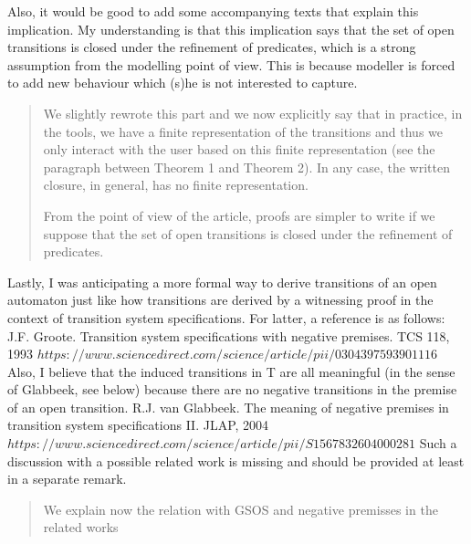 \documentclass{article}
\begin{document}
Also, it would be good to add some accompanying texts that explain this implication. My understanding is that this implication says that the set of open transitions is closed under the
refinement of predicates, which is a strong assumption from the modelling point of view. This is because modeller is forced to add new behaviour which (s)he is not interested to capture.
\begin{quote}
We slightly rewrote this part and we now explicitly say that in practice, in the tools, we have a finite representation of the transitions and thus we only interact with the user based on this finite representation (see the paragraph between Theorem 1 and Theorem 2). In any case, the written closure, in general, has no finite representation. 

From the point of view of the article, proofs are simpler to write if we suppose that  the set of open transitions is closed under the
refinement of predicates.
\end{quote}


Lastly, I was anticipating a more formal way to derive transitions of an open automaton just like how transitions are derived by a witnessing proof in the context of transition system specifications. For latter, a reference is as follows:
J.F. Groote. Transition system specifications with negative premises. TCS 118, 1993 $https://www.sciencedirect.com/science/article/pii/0304397593901116$
Also, I believe that the induced transitions in T are all meaningful (in the sense of Glabbeek, see below) because there are no negative transitions in the premise of an open transition.
R.J. van Glabbeek. The meaning of negative premises in transition system specifications II. JLAP, 2004 $https://www.sciencedirect.com/science/article/pii/S1567832604000281$
Such a discussion with a possible related work is missing and should be provided at least in a separate remark.

\begin{quote}
We explain now the relation with GSOS and negative premisses in the related works
\end{quote}
\end{document}
